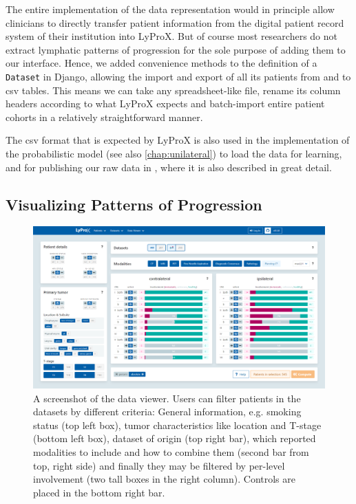 \documentclass[\relativeRoot/main.tex]{subfiles}
\begin{document}
The entire implementation of the data representation would in principle allow clinicians to directly transfer patient information from the digital patient record system of their institution into LyProX. But of course most researchers do not extract lymphatic patterns of progression for the sole purpose of adding them to our interface. Hence, we added convenience methods to the definition of a \texttt{Dataset} in Django, allowing the import and export of all its patients from and to \gls{csv} tables. This means we can take any spreadsheet-like file, rename its column headers according to what LyProX expects and batch-import entire patient cohorts in a relatively straightforward manner.

The \gls{csv} format that is expected by LyProX is also used in the implementation of the probabilistic  model (see also  \cref{chap:unilateral}) to load the data for learning, and for publishing our raw data in , where it is also described in great detail.

\subsection*{Visualizing Patterns of Progression}
\label{subsec:lyprox:implementation:viewer}

\begin{figure}
    \centering
    \includegraphics[width=1.0\textwidth, frame]{figures/data_viewer.png}
    \caption[
        Screenshot of the data viewer dashboard
    ]{
        A screenshot of the data viewer. Users can filter patients in the datasets by different criteria: General information, e.g. smoking status (top left box), tumor characteristics like location and T-stage (bottom left box), dataset of origin (top right bar), which reported modalities to include and how to combine them (second bar from top, right side) and finally they may be filtered by per-level involvement (two tall boxes in the right column). Controls are placed in the bottom right bar.
    }
    \label{fig:lyprox:data_viewer}
\end{figure}
\end{document}
